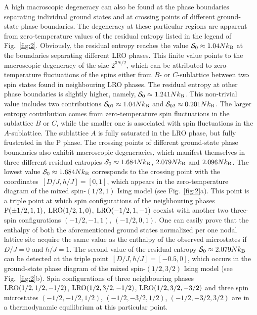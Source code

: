 \documentclass[final,5p,times,sort&compress]{elsarticle}
\begin{document}
A high macroscopic degeneracy can also be found at the phase boundaries separating individual ground states and at \linebreak crossing points of different ground-state phase boundaries. The degeneracy at these particular regions are apparent from zero-temperature values of the residual entropy listed in the legend of Fig.~\ref{fig:2}. Obviously, the residual entropy reaches the value \linebreak ${\cal S}_{0} \approx 1.04Nk_{\rm B}$ at the boundaries separating different LRO phas\-es. This finite value points to the macroscopic degeneracy of the size $2^{3N/2}$, which can be attributed to zero-temperature fluctuations of the spins either from $B$- or $C$-sublattice between two spin states found in neighbouring LRO phases. The residual entropy at other phase boundaries is slightly higher, namely, ${\cal S}_{0} \approx 1.241Nk_{\rm B}$. This non-trivial value includes two contributions ${\cal S}_{01} \approx 1.04Nk_{\rm B}$ and ${\cal S}_{02} \approx 0.201Nk_{\rm B}$. The larger entropy contribution comes from zero-temperature spin fluctuations in the sublattice $B$ or $C$, while the smaller one is associated with spin fluctuations in the $A$-sublattice. The sublattice $A$ is fully saturated in the LRO phase, but fully frustrated in the P phase. The crossing points of different ground-state phase boundaries also exhibit macroscopic degeneracies, which manifest themselves in three different residual entropies ${\cal S}_{0} \approx 1.684Nk_{\rm B}$, $2.079Nk_{\rm B}$ and $2.096Nk_{\rm B}$. The lowest value ${\cal S}_{0} \approx 1.684Nk_{\rm B}$ corresponds to the crossing point with the coordinates~$\left[D/J, h/J\right]=\left[0, 1\right]$, which appears in the zero-temperature diagram of the mixed spin-$(1/2,1)$ Ising model (see Fig.~\ref{fig:2}a). This point is a triple point at which spin configurations of the neighbouring phases ${\rm P}(\pm1/2, 1,1)$, ${\rm LRO}(1/2, 1,0)$, ${\rm LRO}(-1/2, 1,-1)$ coexist with another two three-spin configurations $(-1/2, -1,1)$, $(-1/2, 0,1)$. One can easily prove that the enthalpy of both the aforementioned ground states normalized per one nodal lattice site acquire the same value as the enthalpy of the observed microstates if $D/J=0$ and $h/J=1$. The second value of the residual entropy ${\cal S}_{0} \approx 2.079Nk_{\rm B}$ can be detected at the triple point~$\left[D/J, h/J\right]=\left[-0.5, 0\right]$, which occurs in the ground-state phase diagram of the mixed spin-$(1/2,3/2)$ Ising model (see Fig.~\ref{fig:2}b). Spin configurations of three neighbouring phases ${\rm LRO}(1/2, 1/2,-1/2)$, ${\rm LRO}(1/2, 3/2,-1/2)$, ${\rm LRO}(1/2, 3/2,-3/2)$ and three spin microstates $(-1/2, -1/2,1/2)$, $(-1/2, -3/2,1/2)$, $(-1/2, -3/2, 3/2)$ are in a thermodynamic equilibrium at this particular point. 
\end{document}
